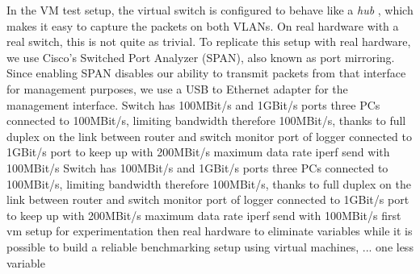 In the VM test setup, the virtual switch is configured to behave like a \textit{hub} \cite{wiki:Ethernet_hub} \cite{NixOS-VM-test-Hub}, which makes it easy to capture the packets on both VLANs.
On real hardware with a real switch, this is not quite as trivial.
To replicate this setup with real hardware, we use Cisco's Switched Port Analyzer (SPAN), also known as port mirroring.
Since enabling SPAN disables our ability to transmit packets from that interface for management purposes, we use a USB to Ethernet adapter for the management interface.
Switch has 100MBit/s and 1GBit/s ports
three PCs connected to 100MBit/s, limiting bandwidth therefore 100MBit/s, thanks to full duplex on the link between router and switch
monitor port of logger connected to 1GBit/s port to keep up with 200MBit/s maximum data rate
iperf send with 100MBit/s
Switch has 100MBit/s and 1GBit/s ports
three PCs connected to 100MBit/s, limiting bandwidth therefore 100MBit/s, thanks to full duplex on the link between router and switch
monitor port of logger connected to 1GBit/s port to keep up with 200MBit/s maximum data rate
iperf send with 100MBit/s
first vm setup for experimentation
then real hardware to eliminate variables
while it is possible to build a reliable benchmarking setup using virtual machines, ...
one less variable

